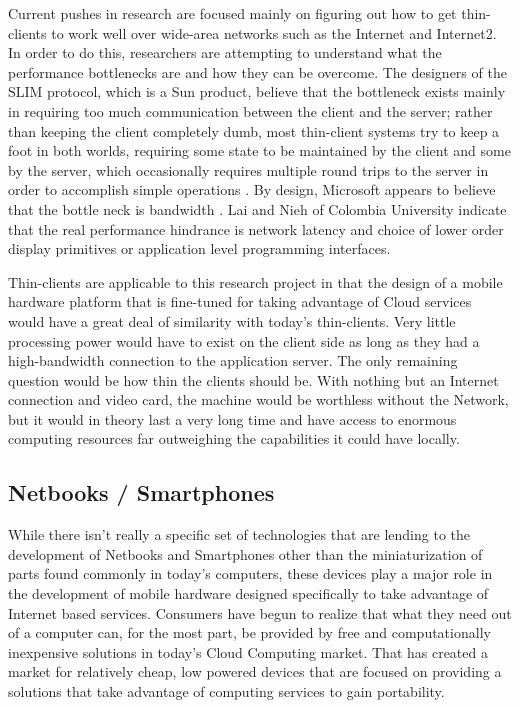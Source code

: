 Current pushes in research are focused mainly on figuring out how to get
thin-clients to work well over wide-area networks such as the Internet and
Internet2.  In order to do this, researchers are attempting to understand what
the performance bottlenecks are and how they can be overcome.  The designers of
the SLIM protocol, which is a Sun product, believe that the bottleneck exists
mainly in requiring too much communication between the client and the server;
rather than keeping the client completely dumb, most thin-client systems try to
keep a foot in both worlds, requiring some state to be maintained by the client
and some by the server, which occasionally requires multiple round trips to the
server in order to accomplish simple operations \citep{schmidt1999}.  By design,
Microsoft appears to believe that the bottle neck is bandwidth \citep{lai2002}.
Lai and Nieh of Colombia University indicate that the real performance hindrance
is network latency and choice of lower order display primitives or application
level programming interfaces.

Thin-clients are applicable to this research project in that the design of a
mobile hardware platform that is fine-tuned for taking advantage of Cloud
services would have a great deal of similarity with today's thin-clients.  Very
little processing power would have to exist on the client side as long as they
had a high-bandwidth connection to the application server.  The only remaining
question would be how thin the clients should be.  With nothing but an Internet
connection and video card, the machine would be worthless without the Network,
but it would in theory last a very long time and have access to enormous
computing resources far outweighing the capabilities it could have locally.

\subsection{Netbooks / Smartphones}

While there isn't really a specific set of technologies that are lending to the
development of Netbooks and Smartphones other than the miniaturization of parts
found commonly in today's computers, these devices play a major role in the
development of mobile hardware designed specifically to take advantage of
Internet based services.  Consumers have begun to realize that what they need
out of a computer can, for the most part, be provided by free and
computationally inexpensive solutions in today's Cloud Computing market.  That
has created a market for relatively cheap, low powered devices that are focused
on providing a solutions that take advantage of computing services to gain
portability.


